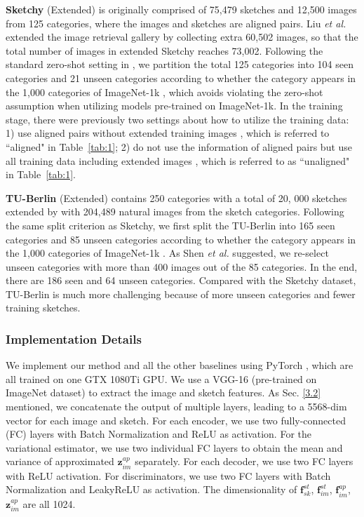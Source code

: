 \documentclass[10pt,twocolumn,letterpaper]{article}
\begin{document}
\textbf{Sketchy} (Extended) \cite{sangkloy2016sketchy} is originally comprised of 75,479 sketches and 12,500 images from 125 categories, where the images and sketches are aligned pairs. Liu \textit{et al.} \cite{liu2017deep} extended the image retrieval gallery by collecting extra 60,502 images, so that the total number of images in extended Sketchy reaches 73,002. Following the standard zero-shot setting in \cite{yelamarthi2018zero}, we partition the total 125 categories into 104 seen categories and 21 unseen categories according to whether the category appears in the 1,000 categories of ImageNet-1k \cite{deng2009imagenet}, which avoids violating the zero-shot assumption when utilizing models pre-trained on ImageNet-1k. In the training stage, there were previously two settings about how to utilize the training data: 1) use aligned pairs without extended training images \cite{yelamarthi2018zero}, which is referred to ``aligned" in Table~\ref{tab:1}; 2) do not use the information of aligned pairs but use all training data including extended images \cite{shen2018zero}, which is referred to as ``unaligned" in Table~\ref{tab:1}.

\textbf{TU-Berlin} (Extended) \cite{eitz2012hdhso} contains 250 categories with a total of 20, 000 sketches extended by \cite{liu2017deep} with 204,489 natural images from the sketch categories. Following the same split criterion as Sketchy, we first split the TU-Berlin into 165 seen categories and 85 unseen categories according to whether the category appears in the 1,000 categories of ImageNet-1k \cite{deng2009imagenet}. As Shen \textit{et al.} \cite{shen2018zero} suggested, we re-select unseen categories with more than 400 images out of the 85 categories. In the end, there are 186 seen and 64 unseen categories. Compared with the Sketchy dataset, TU-Berlin is much more challenging because of more unseen categories and fewer training sketches.

\subsubsection{Implementation Details}
We implement our method and all the other baselines using PyTorch \cite{paszke2017automatic}, which are all trained on one GTX 1080Ti GPU. We use a VGG-16 (pre-trained on ImageNet dataset) to extract the image and sketch features. As Sec. \ref{3.2} mentioned, we concatenate the output of multiple layers, leading to a 5568-dim vector for each image and sketch. For each encoder, we use two fully-connected (FC) layers with Batch Normalization and ReLU as activation. For the variational estimator, we use two individual FC layers to obtain the mean and variance of approximated $\mathbf{z}_{im}^{ap}$ separately. For each decoder, we use two FC layers with ReLU activation. For discriminators, we use two FC layers with Batch Normalization and LeakyReLU as activation. The dimensionality of $\mathbf{f}_{sk}^{st}$, $\mathbf{f}_{im}^{st}$, $\mathbf{f}_{im}^{ap}$, $\mathbf{z}_{im}^{ap}$ are all 1024.
\end{document}
